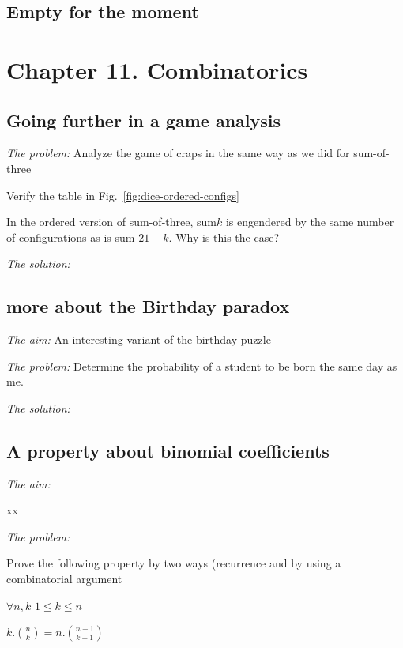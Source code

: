 \subsection{Empty for the moment}



\section{Chapter 11. Combinatorics}

\subsection{Going further in a game analysis}

\noindent \textit{The problem:}
Analyze the game of craps in the same way as we did for sum-of-three

Verify the table in Fig.~\ref{fig:dice-ordered-configs}

In the ordered version of sum-of-three, sum$k$ is engendered by the
same number of configurations as is sum $21 - k$.  
Why is this the case?

\noindent \textit{The solution:}


\subsection{more about the Birthday paradox}

\noindent \textit{The aim:}
An interesting variant of the birthday puzzle
\medskip

\noindent \textit{The problem:}
Determine the
probability of a student to be born the same day as me.
\medskip

\noindent \textit{The solution:}



\subsection{A property about binomial coefficients}

\noindent \textit{The aim:}

xx
\medskip

\noindent \textit{The problem:}

Prove the following property by two ways (recurrence and by using a combinatorial argument

$\forall n,k$ $1 \leq k \leq n$

$k.{n \choose k} = n.{{n-1} \choose {k-1}}$
\medskip


